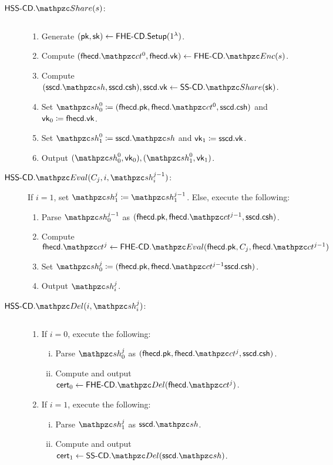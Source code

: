 \begin{description}

\item[$\HSScd.\Sh(s)$:] $ $
\begin{enumerate}
    \item Generate $(\mathsf{pk}, \mathsf{sk}) \leftarrow \mathsf{FHE\textrm{-}CD}.\mathsf{Setup}(1^\lambda)$.
    \item Compute $(\fhecd.\qct^0, \fhecd.\vk) \leftarrow
        \FHEcd.\qEnc(s)$.
    \item Compute $(\sscd.\qsh, \sscd.\csh), \sscd.\vk
    \leftarrow \SScd.\Sh(\sk)$.
\item Set $\qsh_0^0 \seteq (\fhecd.\pk, \fhecd.\qct^0, \sscd.\csh)$
and $\mathsf{vk}_0 \coloneqq \mathsf{fhe}\mathsf{cd}.\mathsf{vk}$.
\item Set $\qsh_1^0 \seteq \sscd.\qsh$ and $\mathsf{vk}_1 \coloneqq \mathsf{ss}\mathsf{cd}.\mathsf{vk}$.
\item Output $(\qsh_0^0, \vk_0), (\qsh_1^0, \vk_1)$.
\end{enumerate}

\item[$\HSScd.\Ev(C_j, i, \qsh_i^{j-1})$:] If $i = 1$, set
$\qsh_1^{j} \seteq \qsh_1^{j-1}$. Else, execute the following:
\begin{enumerate}
\item Parse $\qsh_{0}^{j-1}$ as $(\fhecd.\pk, \fhecd.\qct^{j-1},
\sscd.\csh)$.
\item Compute $\fhecd.\qct^j \leftarrow \FHEcd.\Ev(\fhecd.\pk, C_j,
\fhecd.\qct^{j-1})$
\item Set $\qsh_0^{j} \seteq (\fhecd.\pk, \fhecd.\qct^{j-1}
\sscd.\csh)$.
\item Output $\qsh_i^j$.
\end{enumerate}

\item[$\HSScd.\Del(i, \qsh_i^j)$:] $ $
\begin{enumerate}
\item If $i = 0$, execute the following:
\begin{enumerate}[(i)]
\item Parse $\qsh_0^j$ as $(\fhecd.\pk, \fhecd.\qct^j, \sscd.\csh)$.
\item Compute and output $\cert_0 \leftarrow
\FHEcd.\Del(\fhecd.\qct^j)$.
\end{enumerate}
\item If $i = 1$, execute the following:
\begin{enumerate}[(i)]
\item Parse $\qsh_1^j$ as $\sscd.\qsh$.
\item Compute and output $\cert_1 \leftarrow
\SScd.\Del(\sscd.\qsh)$.
\end{enumerate}
\end{enumerate}


\end{description}

